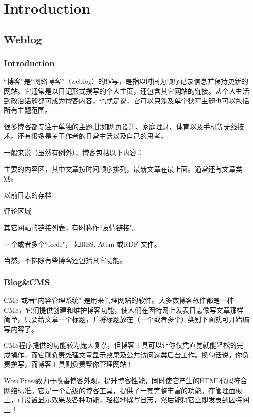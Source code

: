 \part{Introduction}

\chapter{Weblog}

\section{Introduction}

“博客”是“网络博客”（weblog）的缩写，是指以时间为顺序记录信息并保持更新的网站。它通常是以日记形式撰写的个人主页，还包含其它网站的链接。从个人生活到政治话题都可成为博客内容，也就是说，它可以只涉及单个狭窄主题也可以包括所有主题范围。

很多博客都专注于单独的主题,比如网页设计、家庭理财、体育以及手机等无线技术。还有很多是关于作者的日常生活以及自己的思考。

一般来说（虽然有例外），博客包括以下内容：
\begin{compactitem}
\item 主要的内容区，其中文章按时间顺序排列，最新文章在最上面。通常还有文章类别。
\item 以前日志的存档
\item 评论区域
\item 其它网站的链接列表，有时称作``友情链接"。
\item 一个或者多个``feeds"， 如RSS, Atom 或RDF 文件。
\end{compactitem}

当然，不排除有些博客还包括其它功能。

\section{Blog\&CMS}

CMS 或者``内容管理系统" 是用来管理网站的软件。大多数博客软件都是一种CMS，它们提供创建和维护博客功能，使人们在因特网上发表日志像写文章那样简单，只要给文章一个标题，并将标题放在（一个或者多个）类别下面就可开始编写内容了。

CMS程序提供的功能较为庞大复杂，但博客工具可以让你仅凭直觉就能轻松的完成操作，而它则负责处理文章显示效果及公共访问这类后台工作。换句话说，你负责撰写，而博客工具则负责帮你管理网站！

WordPress致力于改善博客外观，提升博客性能，同时使它产生的HTML代码符合网络标准。它是一个高级的博客工具，提供了一套完整丰富的功能。在管理面板上，可设置显示效果及各种功能，轻松地撰写日志，然后能将它立即发表到因特网上！

